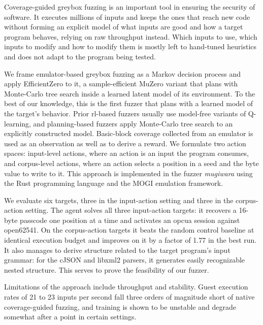 

Coverage-guided greybox fuzzing is an important tool in ensuring the security of software.
It executes millions of inputs and keeps the ones that reach new code without
forming an explicit model of what inputs are good and how a target program behaves,
relying on raw throughput instead.
Which inputs to use, which inputs to modify and how to modify them is mostly
left to hand-tuned heuristics and does not adapt to the program being tested.

We frame emulator-based greybox fuzzing as a Markov decision process and apply EfficientZero
to it, a sample-efficient MuZero variant that plans with Monte-Carlo tree search inside a
learned latent model of its environment.
To the best of our knowledge, this is the first fuzzer that plans with a learned model of the target's behavior.
Prior \gls{rl}-based fuzzers usually use model-free variants of Q-learning, and planning-based fuzzers
apply Monte-Carlo tree search to an explicitly constructed model.
Basic-block coverage collected from an emulator is used as an observation as well as to derive a reward.
We formulate two action spaces: input-level actions, where an action is an input the program
consumes, and corpus-level actions, where an action selects a position in a seed and the byte value
to write to it.
This approach is implemented in the fuzzer \emph{mugiwara} using the Rust programming language
and the MOGI emulation framework.

We evaluate six targets, three in the input-action setting and three in the corpus-action setting.
The agent solves all three input-action targets: it recovers a 16-byte passcode one position at a
time and activates an \gls{opcua} session against open62541.
On the corpus-action targets it beats the random control baseline at identical execution budget
and improves on it by a factor of \num{1.77} in the best run.
It also manages to derive structure related to the target program's input grammar:
for the cJSON and libxml2 parsers, it generates easily recognizable nested structure.
This serves to prove the feasibility of our fuzzer.

Limitations of the approach include throughput and stability.
Guest execution rates of \num{21} to \num{23} inputs per second fall three orders of magnitude short
of native coverage-guided fuzzing, and training is shown to be unstable and
degrade somewhat after a point in certain settings.
